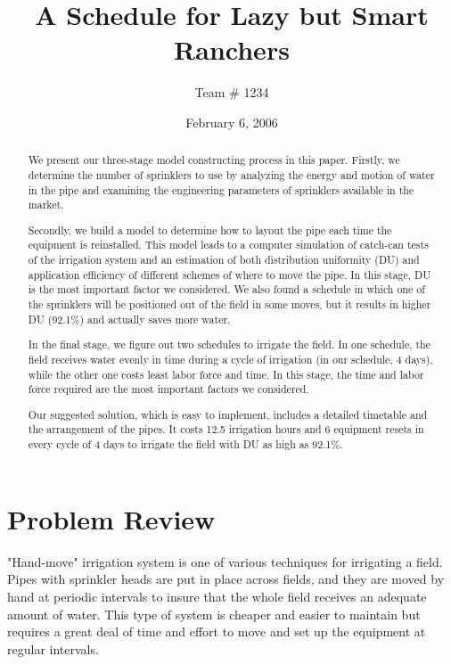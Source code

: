 \documentclass[12pt,a4paper,titlepage]{article}
\begin{document}
\setlength{\parindent}{0pt} \setlength{\parskip}{2ex plus 0.5ex
minus 0.2ex}

\title{A Schedule for Lazy but Smart Ranchers}
\author{Team \# 1234}
\date{February 6, 2006}

\maketitle

\fancyhead{} \pagestyle{fancy}   \setlength{\headrulewidth}


\begin{abstract}
\setlength{\parindent}{0pt} \setlength{\parskip}{2ex plus 0.5ex
minus 0.2ex}

\noindent We present our three-stage model constructing process in
this paper. Firstly, we determine the number of sprinklers to use
by analyzing the energy and motion of water in the pipe and
examining the engineering parameters of sprinklers available in
the market.

Secondly, we build a model to determine how to layout the pipe
each time the equipment is reinstalled. This model leads to a
computer simulation of catch-can tests of the irrigation system
and an estimation of both distribution uniformity (DU) and
application efficiency of different schemes of where to move the
pipe. In this stage, DU is the most important factor we
considered. We also found a schedule in which one of the
sprinklers will be positioned out of the field in some moves, but
it results in higher DU (92.1\%) and actually saves more water.

In the final stage, we figure out two schedules to irrigate the
field. In one schedule, the field receives water evenly in time
during a cycle of irrigation (in our schedule, 4 days), while the
other one costs least labor force and time. In this stage, the
time and labor force required are the most important factors we
considered.

Our suggested solution, which is easy to implement, includes a
detailed timetable and the arrangement of the pipes. It costs 12.5
irrigation hours and 6 equipment resets in every cycle of 4 days
to irrigate the field with DU as high as 92.1\%.

\end{abstract}

\tableofcontents
\newpage

\section{Problem Review}
"Hand-move" irrigation system is one of various techniques for
irrigating a field. Pipes with sprinkler heads are put in place
across fields, and they are moved by hand at periodic intervals to
insure that the whole field receives an adequate amount of water.
This type of system is cheaper and easier to maintain but requires
a great deal of time and effort to move and set up the equipment
at regular intervals.
\end{document}
